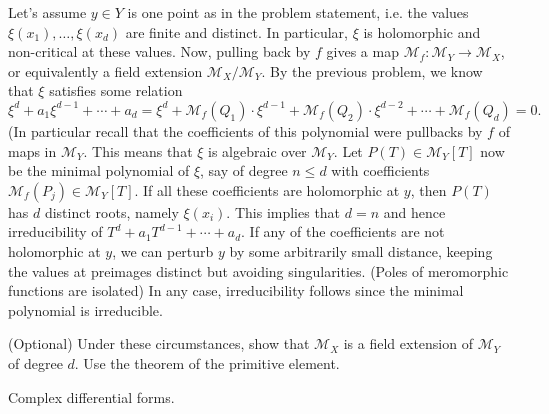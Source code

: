 \documentclass{lkx_pset}
\begin{document}
\begin{solution}
	Let's assume $y\in Y$ is one point as in the problem statement, i.e. the values $\xi(x_1),\ldots, \xi(x_d)$ are finite and distinct. In particular, $\xi$ is holomorphic and non-critical at these values.
	Now, pulling back by $f$ gives a map $\mathcal{M}_f : \mathcal{M}_Y \to \mathcal{M}_X$, or equivalently a field extension $\mathcal{M}_X/\mathcal{M}_Y$. By the previous problem, we know that $\xi$ satisfies some relation
	\[
		\xi^d + a_1\xi^{d-1}+\cdots+a_d=\xi^d + \mathcal{M}_f(Q_1)\cdot  \xi^{d-1} + \mathcal{M}_f(Q_2)\cdot \xi^{d-2}+ \cdots + \mathcal{M}_f(Q_d) = 0.
	\]
	(In particular recall that the coefficients of this polynomial were pullbacks by $f$ of maps in $\mathcal{M}_Y$. This means that $\xi$ is algebraic over $\mathcal{M}_Y$. Let $P(T)\in \mathcal{M}_Y[T]$ now be the minimal polynomial of $\xi$, say of degree $n \leq d$ with coefficients $\mathcal{M}_f(P_j)\in \mathcal{M}_Y[T]$. If all these coefficients are holomorphic at $y$, then $P(T)$ has $d$ distinct roots, namely $\xi(x_i)$. This implies that $d=n$ and hence irreducibility of $T^d + a_1T^{d-1} + \cdots + a_d$. If any of the coefficients are not holomorphic at $y$, we can perturb $y$ by some arbitrarily small distance, keeping the values at preimages distinct but avoiding singularities. (Poles of meromorphic functions are isolated) In any case, irreducibility follows since the minimal polynomial is irreducible.

	\begin{part}{(Optional)}
		Under these circumstances, show that $\mathcal{M}_X$ is a field extension of $\mathcal{M}_Y$ of degree $d$. Use the theorem of the primitive element.
	\end{part}
\end{solution}

\begin{problem}{5}
Complex differential forms.
\end{problem}
\end{document}
